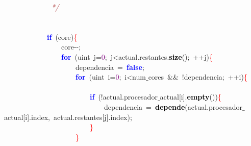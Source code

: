 \mbox{}\textit{\textcolor{Brown}{\ \ \ \ \ \ \ \ \ \ \ \ \ */}} \\
\mbox{} \\
\mbox{} \\
\mbox{}\ \ \ \ \ \ \ \ \ \ \ \ \textbf{\textcolor{Blue}{if}}\ \textcolor{BrickRed}{(}core\textcolor{BrickRed}{)}\textcolor{Red}{\{} \\
\mbox{}\ \ \ \ \ \ \ \ \ \ \ \ \ \ \ \ core\textcolor{BrickRed}{-\/-;} \\
\mbox{}\ \ \ \ \ \ \ \ \ \ \ \ \ \ \ \ \textbf{\textcolor{Blue}{for}}\ \textcolor{BrickRed}{(}\textcolor{TealBlue}{uint}\ j\textcolor{BrickRed}{=}\textcolor{Purple}{0}\textcolor{BrickRed}{;}\ j\textcolor{BrickRed}{\textless{}}actual\textcolor{BrickRed}{.}restantes\textcolor{BrickRed}{.}\textbf{\textcolor{Black}{size}}\textcolor{BrickRed}{();}\ \textcolor{BrickRed}{++}j\textcolor{BrickRed}{)}\textcolor{Red}{\{} \\
\mbox{}\ \ \ \ \ \ \ \ \ \ \ \ \ \ \ \ \ \ \ \ dependencia\ \textcolor{BrickRed}{=}\ \textbf{\textcolor{Blue}{false}}\textcolor{BrickRed}{;} \\
\mbox{}\ \ \ \ \ \ \ \ \ \ \ \ \ \ \ \ \ \ \ \ \textbf{\textcolor{Blue}{for}}\ \textcolor{BrickRed}{(}\textcolor{TealBlue}{uint}\ i\textcolor{BrickRed}{=}\textcolor{Purple}{0}\textcolor{BrickRed}{;}\ i\textcolor{BrickRed}{\textless{}}num$\_$cores\ \textcolor{BrickRed}{\&\&}\ \textcolor{BrickRed}{!}dependencia\textcolor{BrickRed}{;}\ \textcolor{BrickRed}{++}i\textcolor{BrickRed}{)}\textcolor{Red}{\{} \\
\mbox{} \\
\mbox{}\ \ \ \ \ \ \ \ \ \ \ \ \ \ \ \ \ \ \ \ \ \ \ \ \textbf{\textcolor{Blue}{if}}\ \textcolor{BrickRed}{(!}actual\textcolor{BrickRed}{.}procesador$\_$actual\textcolor{BrickRed}{[}i\textcolor{BrickRed}{].}\textbf{\textcolor{Black}{empty}}\textcolor{BrickRed}{())}\textcolor{Red}{\{} \\
\mbox{}\ \ \ \ \ \ \ \ \ \ \ \ \ \ \ \ \ \ \ \ \ \ \ \ \ \ \ \ dependencia\ \textcolor{BrickRed}{=}\ \textbf{\textcolor{Black}{depende}}\textcolor{BrickRed}{(}actual\textcolor{BrickRed}{.}procesador$\_$actual\textcolor{BrickRed}{[}i\textcolor{BrickRed}{].}index\textcolor{BrickRed}{,}\ actual\textcolor{BrickRed}{.}restantes\textcolor{BrickRed}{[}j\textcolor{BrickRed}{].}index\textcolor{BrickRed}{);} \\
\mbox{}\ \ \ \ \ \ \ \ \ \ \ \ \ \ \ \ \ \ \ \ \ \ \ \ \textcolor{Red}{\}} \\
\mbox{}\ \ \ \ \ \ \ \ \ \ \ \ \ \ \ \ \ \ \ \ \textcolor{Red}{\}} \\

